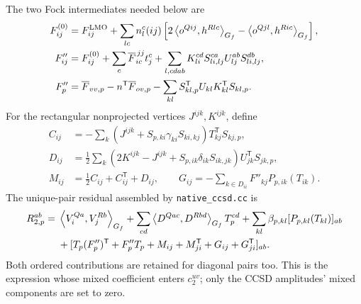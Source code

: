 \documentclass[10pt,letterpaper]{article}
\newcommand{\T}{^{\mathsf T}}
\newcommand{\ip}[2]{\left\langle #1,#2\right\rangle}
\begin{document}
The two Fock intermediates needed below are
\begin{align}
F^{(0)}_{ij}&=F^{\rm LMO}_{ij}+\sum_{lc}n_l^c(ij)
 \left[2\ip{o^{Qij}}{h^{Rlc}}_{G_f}-\ip{o^{Qjl}}{h^{Ric}}_{G_f}\right],\\
F''_{ij}&=F^{(0)}_{ij}+\sum_c\overline F^{\,jj}_{ic}t_j^c
 +\sum_{l,cdab}K_{li}^{cd}S_{li,lj}^{ca}U_{lj}^{ab}S_{li,lj}^{db},\\
F''_p&=\overline F_{vv,p}-n\T\overline F_{ov,p}
 -\sum_{kl}S_{kl,p}\T U_{kl}K_{kl}\T S_{kl,p}.
\end{align}
For the rectangular nonprojected vertices $J^{ijk},K^{ijk}$, define
\begin{align}
C_{ij}&=-\sum_k(J^{ijk}+S_{p,ki}\gamma_{ki}S_{ki,kj})T_{kj}\T S_{kj,p},\\
D_{ij}&=\tfrac12\sum_k(2K^{ijk}-J^{ijk}+S_{p,ik}\delta_{ik}S_{ik,jk})U_{jk}\T S_{jk,p},\\
M_{ij}&=\tfrac12C_{ij}+C_{ij}\T+D_{ij},\qquad
G_{ij}=-\sum_{k\in D_{ii}}F''_{kj}P_{p,ik}(T_{ik}).
\end{align}
The unique-pair residual assembled by \texttt{native\_ccsd.cc} is
\begin{align}
R_{2,p}^{ab}={}&\ip{V_i^{Qa}}{V_j^{Rb}}_{G_f}
 +\sum_{cd}\ip{D^{Qac}}{D^{Rbd}}_{G_f}T_p^{cd}
 +\sum_{kl}\beta_{p,kl}[P_{p,kl}(T_{kl})]_{ab}\notag\\
&+[T_p(F''_p)\T+F''_pT_p+M_{ij}+M_{ji}\T+G_{ij}+G_{ji}\T]_{ab}.
\end{align}
Both ordered contributions are retained for diagonal pairs too. This is the expression whose mixed coefficient enters $c_2^{uv}$; only the CCSD amplitudes' mixed components are set to zero.
\end{document}

